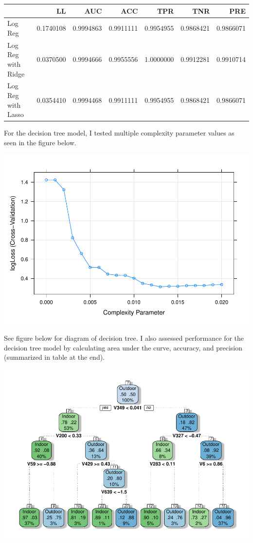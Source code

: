 \documentclass[
  english,
  man]{apa6}
\begin{document}
\begin{tabular}{l|r|r|r|r|r|r}
\hline
  & LL & AUC & ACC & TPR & TNR & PRE\\
\hline
Log Reg & 0.1740108 & 0.9994863 & 0.9911111 & 0.9954955 & 0.9868421 & 0.9866071\\
\hline
Log Reg with Ridge & 0.0370500 & 0.9994666 & 0.9955556 & 1.0000000 & 0.9912281 & 0.9910714\\
\hline
Log Reg with Lasso & 0.0354410 & 0.9994468 & 0.9911111 & 0.9954955 & 0.9868421 & 0.9866071\\
\hline
\end{tabular}

For the decision tree model, I tested multiple complexity parameter values as seen in the figure below.

\includegraphics{Babu_Final_files/figure-latex/descision model-1.pdf}

See figure below for diagram of decision tree. I also assessed performance for the decision tree model by calculating area under the curve, accuracy, and precision (summarized in table at the end).

\includegraphics{Babu_Final_files/figure-latex/show tree-1.pdf}
\end{document}
